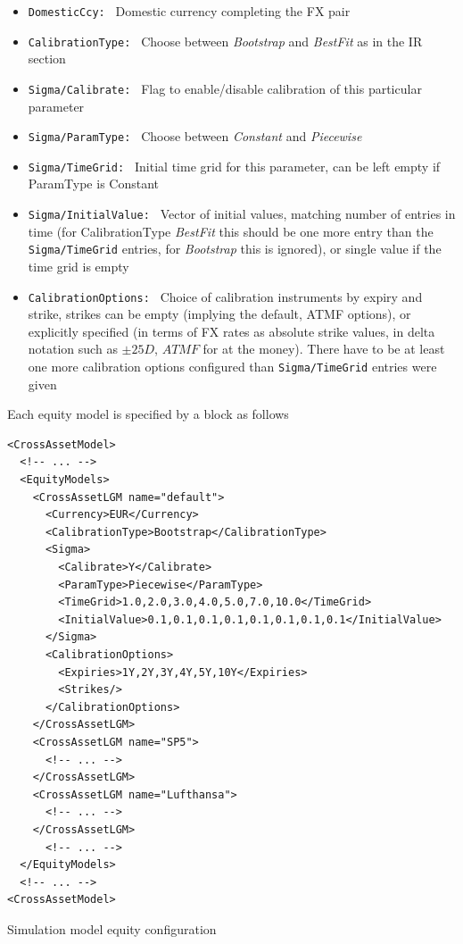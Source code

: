 \documentclass[12pt, a4paper]{article}
\begin{document}
{\begin{itemize}
\item {\tt DomesticCcy: } Domestic currency completing the FX pair
\item {\tt CalibrationType: } Choose between {\em Bootstrap} and {\em BestFit} as in the IR section
\item {\tt Sigma/Calibrate: } Flag to enable/disable calibration of this particular parameter
\item {\tt Sigma/ParamType: } Choose between {\em Constant} and {\em Piecewise}
\item {\tt Sigma/TimeGrid: } Initial time grid for this parameter, can be left empty if ParamType is Constant
\item {\tt Sigma/InitialValue: } Vector of initial values, matching number of entries in time (for CalibrationType {\em BestFit} this should be one more entry than the {\tt Sigma/TimeGrid} entries, for {\em Bootstrap} this is ignored), or single value if the time grid is empty
\item {\tt CalibrationOptions: } Choice of calibration instruments by expiry and strike, strikes can be empty (implying
the default, ATMF options), or explicitly specified (in terms of FX rates as absolute strike values, in delta notation
such as $\pm 25D$, $ATMF$ for at the money). There have to be at least one more calibration options configured than {\tt Sigma/TimeGrid} entries were given
\end{itemize}


\medskip

Each equity model is specified by a block as follows

\begin{listing}[H]
\begin{verbatim}
<CrossAssetModel>	
  <!-- ... -->
  <EquityModels>
    <CrossAssetLGM name="default">
      <Currency>EUR</Currency>
      <CalibrationType>Bootstrap</CalibrationType>
      <Sigma>
        <Calibrate>Y</Calibrate>
        <ParamType>Piecewise</ParamType>
        <TimeGrid>1.0,2.0,3.0,4.0,5.0,7.0,10.0</TimeGrid>
        <InitialValue>0.1,0.1,0.1,0.1,0.1,0.1,0.1,0.1</InitialValue>
      </Sigma>
      <CalibrationOptions>
        <Expiries>1Y,2Y,3Y,4Y,5Y,10Y</Expiries>
        <Strikes/>
      </CalibrationOptions>
    </CrossAssetLGM>
    <CrossAssetLGM name="SP5">
      <!-- ... -->
    </CrossAssetLGM>
    <CrossAssetLGM name="Lufthansa">
      <!-- ... -->
    </CrossAssetLGM>
      <!-- ... -->
  </EquityModels>
  <!-- ... -->
<CrossAssetModel>	
\end{verbatim}
\caption{Simulation model equity configuration}
\label{lst:simulation_model_eq_configuration}
\end{listing}

}
\end{document}
